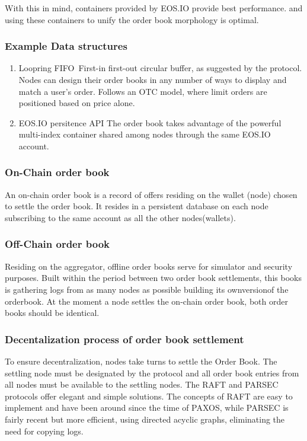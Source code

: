 \documentclass[]{article}
\begin{document}
With this in mind, containers provided by EOS.IO provide best performance.\cite{25} and
using these containers to unify the order book morphology is optimal.


\subsubsection{Example Data structures}
\begin{enumerate}
\item Loopring FIFO\
	First-in first-out circular buffer, as suggested by the protocol. 
	Nodes can design their order books in any number of ways to display and match a user's order. 
	Follows an OTC model, where limit orders are positioned based on price alone.
	\cite{7}  
\item EOS.IO persitence API
	The order book takes advantage of the powerful multi-index container shared among nodes through the same EOS.IO account.
\end{enumerate}


\subsubsection{On-Chain order book}
An on-chain order book is a record of offers residing on the wallet (node) chosen to settle the order book. It resides in a persistent database on each node subscribing to the same account as all the other nodes(wallets).

\subsubsection{Off-Chain order book}
Residing on the aggregator, offline order books serve for simulator and security purposes.
Built within the period between two order book settlements, this books is gathering logs from as many nodes as possible building its ownversionof the orderbook. At the moment a node settles the on-chain order book, both order books should be identical.
 
 
 
\subsubsection{Decentalization process of order book settlement}
To ensure decentralization, nodes take turns to settle the Order Book. 
The settling node must be designated by the protocol and all order book entries from all nodes must be available to the settling nodes. 
The RAFT\cite{18} and PARSEC\cite{23} protocols offer elegant and simple solutions. 
The concepts of RAFT are easy to implement and have been around since the time of PAXOS\cite{24}, 
while PARSEC is fairly recent but more efficient, using directed acyclic graphs, eliminating the need for copying logs.
\end{document}
